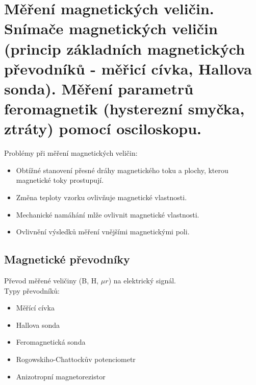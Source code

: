 \section{Měření magnetických veličin. Snímače magnetických veličin (princip základních magnetických převodníků - měřicí cívka, Hallova sonda). Měření parametrů feromagnetik (hysterezní smyčka, ztráty) pomocí osciloskopu.}
Problémy při měření magnetických veličin:
\begin{itemize}
    \item Obtížné stanovení přesné dráhy magnetického toku a plochy, kterou magnetické toky prostupují.
    \item Změna teploty vzorku ovlivňuje magnetické vlastnosti.
    \item Mechanické namáhání mlže ovlivnit magnetické vlastnosti.
    \item Ovlivnění výsledků měření vnějšími magnetickými poli.
\end{itemize}

\subsection{Magnetické převodníky}
Převod měřené veličiny (B, H, \(\mu r\)) na elektrický signál.\\
Typy převodníků:
\begin{itemize}
    \item Měřící cívka
    \item Hallova sonda
    \item Feromagnetická sonda
    \item Rogowskiho-Chattockův potenciometr
    \item Anizotropní magnetorezistor
\end{itemize}
